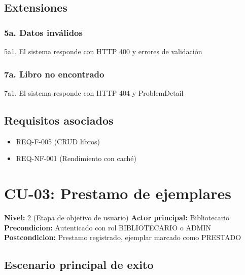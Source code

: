 \documentclass[
11pt,
a4paper,
]{report}
\providecommand{\tightlist}{%
	\setlength{\itemsep}{0pt}\setlength{\parskip}{0pt}}
\begin{document}
	\hypertarget{extensiones-1}{%
		\subsection{Extensiones}\label{extensiones-1}}
	
	\hypertarget{a.-datos-invuxe1lidos}{%
		\subsubsection{5a. Datos inválidos}\label{a.-datos-invuxe1lidos}}
	
	5a1. El sistema responde con HTTP 400 y errores de validación
	
	\hypertarget{a.-libro-no-encontrado}{%
		\subsubsection{7a. Libro no encontrado}\label{a.-libro-no-encontrado}}
	
	7a1. El sistema responde con HTTP 404 y ProblemDetail
	
	\hypertarget{requisitos-asociados-1}{%
		\subsection{Requisitos asociados}\label{requisitos-asociados-1}}
	
	\begin{itemize}
		\tightlist
		\item
		REQ-F-005 (CRUD libros)
		\item
		REQ-NF-001 (Rendimiento con caché)
	\end{itemize}
	
	\hypertarget{cu-03-prestamo-de-ejemplares}{%
		\section{CU-03: Prestamo de ejemplares}\label{cu-03-prestamo-de-ejemplares}}
	
	\textbf{Nivel:} 2 (Etapa de objetivo de usuario)
	\textbf{Actor principal:} Bibliotecario
	\textbf{Precondicion:} Autenticado con rol BIBLIOTECARIO o ADMIN
	\textbf{Postcondicion:} Prestamo registrado, ejemplar marcado como PRESTADO
	
	\hypertarget{escenario-principal-de-exito}{%
		\subsection{Escenario principal de exito}\label{escenario-principal-de-exito}}
	
\end{document}
